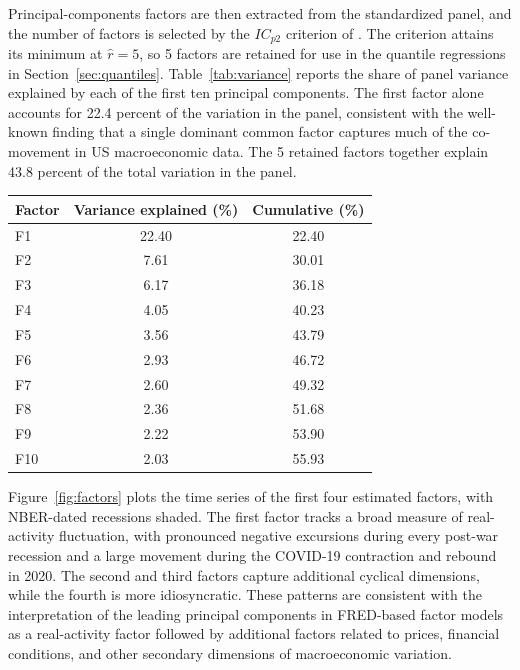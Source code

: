 \documentclass[12pt]{report} %
\begin{document}
Principal-components factors are then extracted from the standardized panel, and the number of factors is selected by the $IC_{p2}$ criterion of \textcite{bai2002determining}. The criterion attains its minimum at $\hat{r} = 5$, so 5 factors are retained for use in the quantile regressions in Section~\ref{sec:quantiles}. Table~\ref{tab:variance} reports the share of panel variance explained by each of the first ten principal components. The first factor alone accounts for 22.4 percent of the variation in the panel, consistent with the well-known finding that a single dominant common factor captures much of the co-movement in US macroeconomic data. The 5 retained factors together explain 43.8 percent of the total variation in the panel.

\begin{table}[htbp]
	{\small
	\begin{tabular}{lcc}
		\toprule
		Factor & Variance explained (\%) & Cumulative (\%) \\
		\midrule
		F1  & 22.40 & 22.40 \\
		F2  &  7.61 & 30.01 \\
		F3  &  6.17 & 36.18 \\
		F4  &  4.05 & 40.23 \\
		F5  &  3.56 & 43.79 \\
		F6  &  2.93 & 46.72 \\
		F7  &  2.60 & 49.32 \\
		F8  &  2.36 & 51.68 \\
		F9  &  2.22 & 53.90 \\
		F10 &  2.03 & 55.93 \\
		\bottomrule
	\end{tabular}}
\end{table}

Figure~\ref{fig:factors} plots the time series of the first four estimated factors, with NBER-dated recessions shaded. The first factor tracks a broad measure of real-activity fluctuation, with pronounced negative excursions during every post-war recession and a large movement during the COVID-19 contraction and rebound in 2020. The second and third factors capture additional cyclical dimensions, while the fourth is more idiosyncratic. These patterns are consistent with the interpretation of the leading principal components in FRED-based factor models as a real-activity factor followed by additional factors related to prices, financial conditions, and other secondary dimensions of macroeconomic variation.
\end{document}
